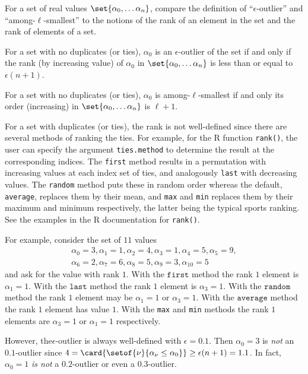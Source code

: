 \documentclass[12pt]{article}
\begin{document}
\begin{exercise}
    For a set of real values \( \set{\alpha_0, \dots \alpha_n} \),
    compare the definition of ``\( \epsilon \)-outlier'' and ``among-\(
    \ell \)-smallest'' to the notions of the rank of an element in the
    set and the rank of elements of a set.
\end{exercise}
\begin{solution}
    For a set with no duplicates (or ties), \( \alpha_0 \) is an \(
    \epsilon \)-outlier of the set if and only if the rank (by
    increasing value) of \( \alpha_0 \) in \( \set{\alpha_0, \dots
    \alpha_n} \) is less than or equal to \( \epsilon(n+1) \).

    For a set with no duplicates (or ties), \( \alpha_0 \) is among-\(
    \ell \)-smallest if and only its order (increasing) in \( \set{\alpha_0,
    \dots \alpha_n} \) is \( \ell + 1 \).

    For a set with duplicates (or ties), the rank is not well-defined
    since there are several methods of ranking the ties.  For example,
    for the R function \texttt{rank()}, the user can specify the
    argument \texttt{ties.method} to determine the result at the
    corresponding indices.  The \texttt{first} method results in a
    permutation with increasing values at each index set of ties, and
    analogously \texttt{last} with decreasing values.  The \texttt{random}
    method puts these in random order whereas the default, \texttt{average},
    replaces them by their mean, and \texttt{max} and \texttt{min}
    replaces them by their maximum and minimum respectively, the latter
    being the typical sports ranking.  See the examples in the R
    documentation for \texttt{rank()}.

    For example, consider the set of \( 11 \) values
    \begin{multline*}
        \alpha_0 = 3, \alpha_1 = 1, \alpha_2 = 4, \alpha_3 = 1,
        \alpha_4 = 5, \alpha_5 = 9, \\
        \alpha_6 = 2, \alpha_7 = 6, \alpha_8 = 5, \alpha_9 = 3, \alpha_
        {10} = 5
    \end{multline*}
    and ask for the value with rank \( 1 \).  With the \( \texttt{first}
    \) method the rank \( 1 \) element is \( \alpha_1 = 1 \).  With the \(
    \texttt{last} \) method the rank \( 1 \) element is \( \alpha_3 = 1 \).
    With the \( \texttt{random} \) method the rank \( 1 \) element may
    be \( \alpha_1 = 1 \) or \( \alpha_3 = 1 \).  With the \( \texttt{average}
    \) method the rank \( 1 \) element has value \( 1 \).  With the
    \texttt{max} and \texttt{min} methods the rank \( 1 \) elements are \(
    \alpha_3 = 1 \) or \( \alpha_1 = 1 \) respectively.

    However, the\( \epsilon \)-outlier is always well-defined with \(
    \epsilon = 0.1 \). Then \( \alpha_0 = 3 \) is \emph{not} an \( 0.1 \)-outlier
    since \( 4 = \card{%
    \setof{\nu}{\alpha_{\nu} \le \alpha_0}} \ge \epsilon(n+1) = 1.1 \).
    In fact, \( \alpha_0 = 1 \) \emph{is not} a \( 0.2 \)-outlier or
    even a \( 0.3 \)-outlier.
\end{solution}
\end{document}
